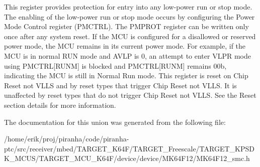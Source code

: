 This register provides protection for entry into any low-\/power run or stop mode. The enabling of the low-\/power run or stop mode occurs by configuring the Power Mode Control register (P\+M\+C\+T\+RL). The P\+M\+P\+R\+OT register can be written only once after any system reset. If the M\+CU is configured for a disallowed or reserved power mode, the M\+CU remains in its current power mode. For example, if the M\+CU is in normal R\+UN mode and A\+V\+LP is 0, an attempt to enter V\+L\+PR mode using P\+M\+C\+T\+RL\mbox{[}R\+U\+NM\mbox{]} is blocked and P\+M\+C\+T\+RL\mbox{[}R\+U\+NM\mbox{]} remains 00b, indicating the M\+CU is still in Normal Run mode. This register is reset on Chip Reset not V\+L\+LS and by reset types that trigger Chip Reset not V\+L\+LS. It is unaffected by reset types that do not trigger Chip Reset not V\+L\+LS. See the Reset section details for more information. 

The documentation for this union was generated from the following file\+:\begin{DoxyCompactItemize}
\item 
/home/erik/proj/piranha/code/piranha-\/ptc/src/receiver/mbed/\+T\+A\+R\+G\+E\+T\+\_\+\+K64\+F/\+T\+A\+R\+G\+E\+T\+\_\+\+Freescale/\+T\+A\+R\+G\+E\+T\+\_\+\+K\+P\+S\+D\+K\+\_\+\+M\+C\+U\+S/\+T\+A\+R\+G\+E\+T\+\_\+\+M\+C\+U\+\_\+\+K64\+F/device/device/\+M\+K64\+F12/M\+K64\+F12\+\_\+smc.\+h\end{DoxyCompactItemize}
